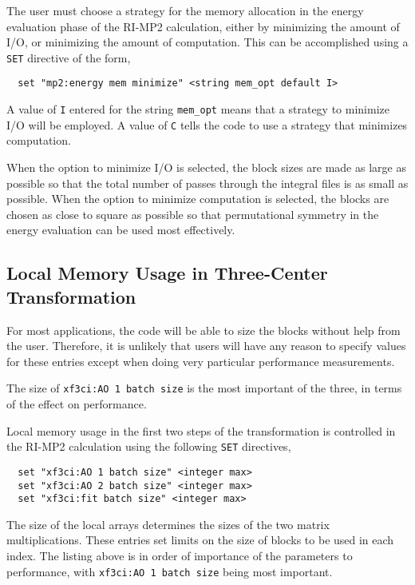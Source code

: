 The user must choose a  strategy for the memory allocation in the energy
evaluation phase of the RI-MP2 calculation, either by minimizing the amount
of I/O, or minimizing the amount of computation.  This can be accomplished 
using a \verb+SET+ directive of the form,

\begin{verbatim}
  set "mp2:energy mem minimize" <string mem_opt default I>
\end{verbatim}

A value of \verb+I+ entered for the string \verb+mem_opt+ means that a
strategy to minimize I/O will be employed.  A value of \verb+C+ tells
the code to use a strategy that minimizes computation.

When the option to minimize I/O is selected, the block sizes are made
as large as possible so that the total number of passes through the
integral files is as small as possible.  When the option to minimize
computation is selected, the blocks are chosen as close to square as
possible so that permutational symmetry in the energy evaluation can
be used most effectively.


\subsection{Local Memory Usage in Three-Center Transformation}

For most applications, the code will be able to size the blocks
without help from the user.  Therefore, it is unlikely that users will
have any reason to specify values for these entries except when doing
very particular performance measurements.

The size of \verb+xf3ci:AO 1 batch size+ is the most important of the
three, in terms of the effect on performance.

Local memory usage in the first two steps of the transformation is
controlled in the RI-MP2 calculation using the following \verb+SET+
directives,

\begin{verbatim}
  set "xf3ci:AO 1 batch size" <integer max>
  set "xf3ci:AO 2 batch size" <integer max>
  set "xf3ci:fit batch size" <integer max>
\end{verbatim}

The size of the local arrays determines the sizes of the two matrix
multiplications.  These entries set limits on the size of blocks to be
used in each index.  The listing above is in order of importance of
the parameters to performance, with \verb+xf3ci:AO 1 batch size+ being
most important.


